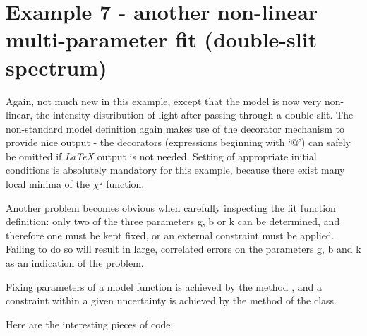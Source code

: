 \documentclass[a4paper,10pt,english]{sphinxmanual}
\begin{document}
\section{Example 7 - another non-linear multi-parameter fit (double-slit spectrum)}
\label{index:example-7-another-non-linear-multi-parameter-fit-double-slit-spectrum}
Again, not much new in this example, except that the
model is now very non-linear, the intensity distribution
of light after passing through a double-slit. The
non-standard model definition again makes use of the
decorator mechanism to provide nice output - the decorators
(expressions beginning with `@') can safely be omitted if \emph{LaTeX}
output is not needed. Setting of appropriate initial
conditions is absolutely mandatory for this example,
because there  exist many local minima of the \(\chi\)² function.

Another problem becomes obvious when carefully inspecting
the fit function definition: only two of the three parameters g,
b or k can be determined, and therefore one must be kept fixed,
or an external constraint must be applied.
Failing to do so will result in large, correlated errors
on the parameters g, b and k as an indication of the problem.

Fixing parameters of a model function is achieved by the method
{\hyperref[index:kafe.fit.Fit.fix_parameters]{}}, and a constraint within a given uncertainty
is achieved by the method {\hyperref[index:kafe.fit.Fit.constrain_parameters]{}}
of the {\hyperref[index:kafe.fit.Fit]{}} class.

Here are the interesting pieces of code:
\end{document}
